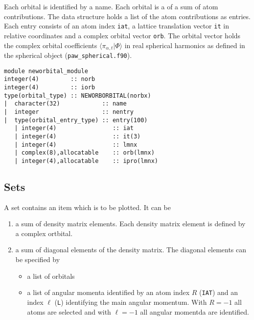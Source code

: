 \documentclass[11pt,a4paper]{report}
\begin{document}
Each orbital is identified by a name.  Each orbital is a of a sum of
atom contributions.  The data structure holds a list of the atom
contributions as entries.  Each entry consists of an atom index
\verb|iat|, a lattice translation vector \verb|it| in relative
coordinates and a complex orbital vector \verb|orb|.  The orbital
vector holds the complex orbital coefficients
$\langle\pi_{\alpha,t}|\Phi\rangle$ in real spherical harmonics as
defined in the spherical object (\verb|paw_spherical.f90|).

\begin{verbatim}
module neworbital_module
integer(4)         :: norb
integer(4)         :: iorb
type(orbital_type) :: NEWORBORBITAL(norbx)
|  character(32)            :: name
|  integer                  :: nentry
|  type(orbital_entry_type) :: entry(100)
   | integer(4)                :: iat
   | integer(4)                :: it(3)
   | integer(4)                :: lmnx
   | complex(8),allocatable    :: orb(lmnx)
   | integer(4),allocatable    :: ipro(lmnx)
\end{verbatim}

\subsection{Sets}
A set contains an item which is to be plotted. 
It can be 
\begin{enumerate}
\item a sum of density matrix elements. Each density matrix element is
  defined by a complex ortbital.
\item a sum of diagonal elements of the density matrix.
  The diagonal elements can be specified by 
  \begin{itemize}
    \item a list of orbitals
    \item a list of angular momenta identified by an atom index $R$
      (\verb|IAT|) and an index $\ell$ (\verb|L|) identifying the main
      angular momentum. With $R=-1$ all atoms are selected and with
      $\ell=-1$ all angular momentda are identified.
  \end{itemize}
\end{enumerate}
\end{document}
